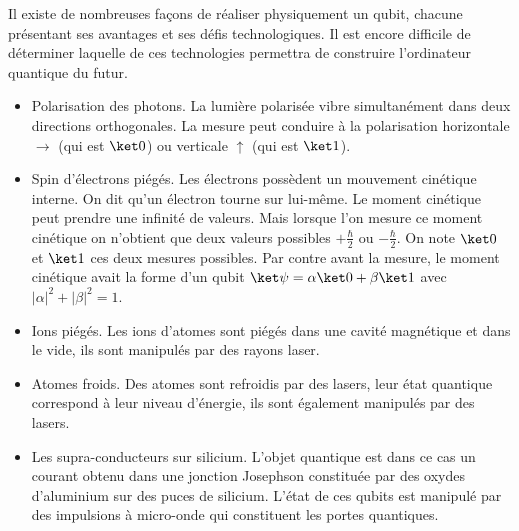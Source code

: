 \documentclass[11pt,class=report,crop=false]{standalone}
\begin{document}

Il existe de nombreuses façons de réaliser physiquement un qubit, chacune présentant ses avantages et ses défis technologiques. Il est encore difficile de déterminer laquelle de ces technologies permettra de construire l'ordinateur quantique du futur. 

\begin{itemize}

  \item Polarisation des photons. La lumière polarisée vibre simultanément dans deux directions orthogonales. La mesure peut conduire à la polarisation horizontale $\rightarrow$ (qui est $\ket0$) ou verticale $\uparrow$ (qui est $\ket1$).

  \item Spin d'électrons piégés. Les électrons possèdent un mouvement cinétique interne. On dit qu'un électron \og{}tourne sur lui-même\fg{}. Le moment cinétique peut prendre une infinité de valeurs. Mais lorsque l'on mesure ce moment cinétique on n'obtient que deux valeurs possibles $+\frac\hbar2$ ou $-\frac\hbar2$.
  On note $\ket0$ et $\ket1$ ces deux mesures possibles. 
  Par contre avant la mesure, le moment cinétique avait la forme d'un qubit
  $\ket\psi = \alpha\ket0+\beta\ket1$ avec $|\alpha|^2+|\beta|^2=1$.
 
  \item Ions piégés. Les ions d'atomes sont piégés dans une cavité magnétique et dans le vide, ils sont manipulés par des rayons laser.
  
  \item Atomes froids. Des atomes sont refroidis par des lasers, leur état quantique correspond à leur niveau d'énergie, ils sont également manipulés par des lasers.
  
  \item Les supra-conducteurs sur silicium. L'objet quantique est dans ce cas un courant obtenu dans une jonction Josephson constituée par des oxydes d'aluminium sur des puces de silicium. L'état de ces qubits est manipulé par des impulsions à micro-onde qui constituent les portes quantiques.
  
  
\end{itemize}
\end{document}

